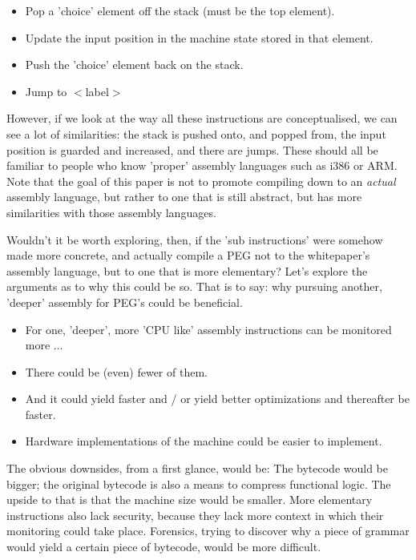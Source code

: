 \begin{itemize}
\item Pop a 'choice' element off the stack (must be the top element).
\item Update the input position in the machine state stored in that element.
\item Push the 'choice' element back on the stack.
\item Jump to $<$label$>$
\end{itemize}

However, if we look at the way all these instructions are conceptualised,
we can see a lot of similarities: the stack is pushed onto, and popped from,
the input position is guarded and increased, and there are jumps.
These should all be familiar to people who know 'proper' assembly
languages such as i386 or ARM. Note that the goal of this paper is not
to promote compiling down to an \textit{actual} assembly language, but
rather to one that is still abstract, but has more similarities with
those assembly languages.

Wouldn't it be worth exploring, then,
if the 'sub instructions' were somehow made more concrete, and actually
compile a PEG not to the whitepaper's assembly language, but to one that
is more elementary? Let's explore the arguments as to why this could be so.
That is to say: why pursuing another, 'deeper' assembly for PEG's could be
beneficial.

\begin{itemize}
\item For one, 'deeper', more 'CPU like' assembly instructions can be monitored
more ...
\item There could be (even) fewer of them.
\item And it could yield faster and / or yield better optimizations and
thereafter be faster.
\item Hardware implementations of the machine could be easier to implement.
\end{itemize}

The obvious downsides, from a first glance, would be:
The bytecode would be bigger; the original bytecode is also a means to
compress functional logic. The upside to that is that the machine size
would be smaller.
More elementary instructions also lack security, because they lack more
context in which their monitoring could take place.
Forensics, trying to discover why a piece of grammar would yield a
certain piece of bytecode, would be more difficult.
